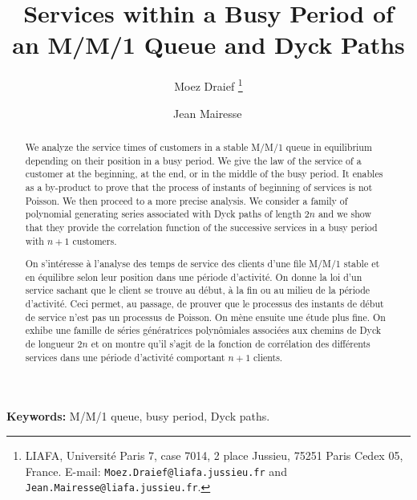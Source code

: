 \documentclass[11pt,a4paper]{article}
\numberwithin{equation}{section}
\newcommand{\1}{\mathbbm{1}}
\begin{document}
\noindent

\title{\bf Services within a Busy Period of an M/M/1 Queue and Dyck
  Paths}




\author{Moez {\sc Draief}
\thanks{LIAFA, Universit{\'e} Paris 7, case 7014,
2 place Jussieu, 75251 Paris Cedex 05, France.
E-mail: {\tt Moez.Draief@liafa.jussieu.fr}
and {\tt  Jean.Mairesse@liafa.jussieu.fr}.}
\and
Jean {\sc Mairesse}\,\footnotemark[1]
}

\maketitle

\begin{abstract}

We analyze the service times of customers in a stable M/M/1 queue in
equilibrium depending on their position in a busy period.
We give the law of the service of a customer at the beginning, at the end,
or in the middle of the busy period. It enables as a by-product to prove
that the process of instants of beginning of services is not Poisson.
We then proceed to a more precise analysis. We consider a family of
polynomial generating series associated with Dyck paths of length $2n$
and we show that they provide the correlation function of the
successive services in a busy period with $n+1$ customers.

\end{abstract}

\renewcommand\abstractname{R\'esum\'e}
\begin{abstract}
On s'int\'eresse \`a l'analyse des temps de service des clients
d'une file M/M/1 stable et en \'equilibre selon
leur position dans une p\'eriode d'activit\'e.
On donne la loi d'un service sachant que le client se
trouve au d\'ebut, \`a la fin ou au milieu de la p\'eriode d'activit\'e. Ceci
permet, au passage, de prouver que le processus des instants de
d\'ebut de service n'est pas un processus de
Poisson. On m\`ene ensuite une \'etude plus fine.
On exhibe une famille de s\'eries g\'en\'eratrices
polyn\^omiales associ\'ees aux chemins de Dyck de longueur $2n$  et on
montre qu'il s'agit de la fonction de corr\'elation des diff\'erents services dans une
p\'eriode d'activit\'e comportant $n+1$ clients.
\end{abstract}


\smallskip

{\noindent\bf Keywords:} M/M/1 queue, busy period, Dyck paths.
\end{document}
